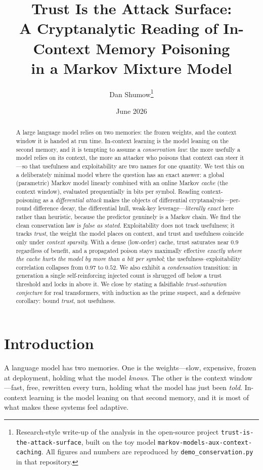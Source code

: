 \documentclass[11pt]{article}
\title{\bfseries Trust Is the Attack Surface:\\[2pt]
A Cryptanalytic Reading of In-Context Memory Poisoning\\
in a Markov Mixture Model}
\author{Dan Shumow\thanks{Research-style write-up of the analysis in the
open-source project \texttt{trust-is-the-attack-surface}, built on the toy model
\texttt{markov-models-aux-context-caching}. All figures and numbers are reproduced by
\texttt{demo\_conservation.py} in that repository.}}
\date{June 2026}
\theoremstyle{plain}
\theoremstyle{definition}
\theoremstyle{remark}
\begin{document}
\maketitle

\begin{abstract}
A large language model relies on two memories: the frozen weights, and the context
window it is handed at run time. In-context learning is the model leaning on the second
memory, and it is tempting to assume a \emph{conservation law}: the more usefully a model
relies on its context, the more an attacker who poisons that context can steer it---so
that usefulness and exploitability are two names for one quantity. We test this on a
deliberately minimal model where the question has an exact answer: a global (parametric)
Markov model linearly combined with an online Markov \emph{cache} (the context window),
evaluated prequentially in bits per symbol. Reading context-poisoning as a
\emph{differential attack} makes the objects of differential cryptanalysis---per-round
difference decay, the differential hull, weak-key leverage---\emph{literally exact} here
rather than heuristic, because the predictor genuinely is a Markov chain. We find the
clean conservation law is \emph{false as stated}. Exploitability does not track
usefulness; it tracks \emph{trust}, the weight the model places on context, and trust and
usefulness coincide only under \emph{context sparsity}. With a dense (low-order) cache,
trust saturates near $0.9$ regardless of benefit, and a propagated poison stays maximally
effective \emph{exactly where the cache hurts the model by more than a bit per symbol};
the usefulness--exploitability correlation collapses from $0.97$ to $0.52$. We also exhibit
a \emph{condensation} transition: in generation a single self-reinforcing injected count is
shrugged off below a trust threshold and locks in above it. We close by stating a
falsifiable \emph{trust-saturation conjecture} for real transformers, with induction as the
prime suspect, and a defensive corollary: bound \emph{trust}, not usefulness.
\end{abstract}

\section{Introduction}
A language model has two memories. One is the weights---slow, expensive, frozen at
deployment, holding what the model \emph{knows}. The other is the context window---fast,
free, rewritten every turn, holding what the model has just been \emph{told}. In-context
learning is the model leaning on that second memory, and it is most of what makes these
systems feel adaptive.
\end{document}
